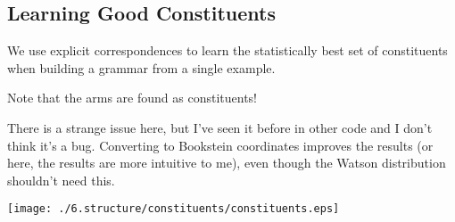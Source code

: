 

\subsection{Learning Good Constituents}

We use explicit correspondences to learn the statistically best set of
constituents when building a grammar from a single example.

Note that the arms are found as constituents!

There is a strange issue here, but I've seen it before in other code
and I don't think it's a bug. Converting to Bookstein coordinates
improves the results (or here, the results are more intuitive to me),
even though the Watson distribution shouldn't need this.


\texttt{[image: ./6.structure/constituents/constituents.eps]}

